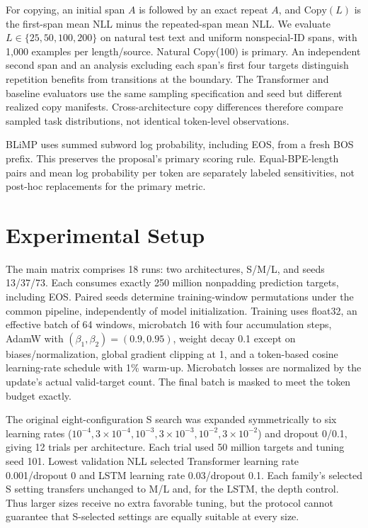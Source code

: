 \documentclass[10pt]{article}
\begin{document}
For copying, an initial span $A$ is followed by an exact repeat $A$, and $\mathrm{Copy}(L)$ is the first-span mean NLL minus the repeated-span mean NLL. We evaluate $L\in\{25,50,100,200\}$ on natural test text and uniform nonspecial-ID spans, with 1,000 examples per length/source. Natural Copy(100) is primary. An independent second span and an analysis excluding each span's first four targets distinguish repetition benefits from transitions at the boundary. The Transformer and baseline evaluators use the same sampling specification and seed but different realized copy manifests. Cross-architecture copy differences therefore compare sampled task distributions, not identical token-level observations.

BLiMP uses summed subword log probability, including EOS, from a fresh BOS prefix. This preserves the proposal's primary scoring rule. Equal-BPE-length pairs and mean log probability per token are separately labeled sensitivities, not post-hoc replacements for the primary metric.

\section{Experimental Setup}

The main matrix comprises 18 runs: two architectures, S/M/L, and seeds 13/37/73. Each consumes exactly 250 million nonpadding prediction targets, including EOS. Paired seeds determine training-window permutations under the common pipeline, independently of model initialization. Training uses float32, an effective batch of 64 windows, microbatch 16 with four accumulation steps, AdamW with $(\beta_1,\beta_2)=(0.9,0.95)$, weight decay 0.1 except on biases/normalization, global gradient clipping at 1, and a token-based cosine learning-rate schedule with 1\% warm-up. Microbatch losses are normalized by the update's actual valid-target count. The final batch is masked to meet the token budget exactly.

The original eight-configuration S search was expanded symmetrically to six learning rates ($10^{-4},3\!\times\!10^{-4},10^{-3},3\!\times\!10^{-3},10^{-2},3\!\times\!10^{-2}$) and dropout 0/0.1, giving 12 trials per architecture. Each trial used 50 million targets and tuning seed 101. Lowest validation NLL selected Transformer learning rate 0.001/dropout 0 and LSTM learning rate 0.03/dropout 0.1. Each family's selected S setting transfers unchanged to M/L and, for the LSTM, the depth control. Thus larger sizes receive no extra favorable tuning, but the protocol cannot guarantee that S-selected settings are equally suitable at every size.
\end{document}
